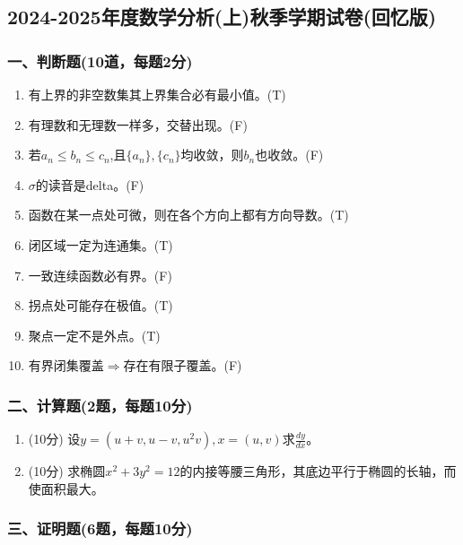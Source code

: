 \subsection{2024-2025年度数学分析(上)秋季学期试卷(回忆版)}

\subsubsection*{一、判断题(10道，每题2分)}

\begin{enumerate}
    \item 有上界的非空数集其上界集合必有最小值。\hfill (T)
    \item 有理数和无理数一样多，交替出现。\hfill (F)
    \item 若\(a_n \le b_n \le c_n\),且\(\{a_n\},\{c_n\}\)均收敛，则\(b_n\)也收敛。\hfill (F)
    \item \(\sigma\)的读音是delta。\hfill (F)
    \item 函数在某一点处可微，则在各个方向上都有方向导数。\hfill (T)
    \item 闭区域一定为连通集。\hfill (T)
    \item 一致连续函数必有界。\hfill (F)
    \item 拐点处可能存在极值。\hfill (T)
    \item 聚点一定不是外点。\hfill (T)
    \item 有界闭集覆盖\(\Rightarrow\)存在有限子覆盖。\hfill (F)
\end{enumerate}

\subsubsection*{二、计算题(2题，每题10分)}

\begin{enumerate}
    \item (10分) 设\(y=(u+v,u-v,u^2v),x=(u,v)\)求\(\frac{dy}{dx}\)。

    \item (10分) 求椭圆\(x^2+3y^2=12\)的内接等腰三角形，其底边平行于椭圆的长轴，而使面积最大。
\end{enumerate}

\subsubsection*{三、证明题(6题，每题10分)}

